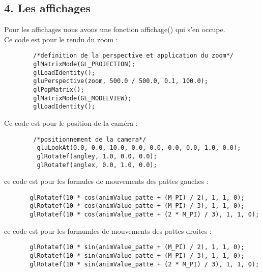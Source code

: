 \documentclass[11pt]{article}
\begin{document}
\subsection*{4. Les affichages}

    Pour les affichages nous avons une fonction affichage() qui s'en occupe.\\
     Ce code est pour le rendu du zoom :
     \begin{lstlisting}
        /*definition de la perspective et application du zoom*/
        glMatrixMode(GL_PROJECTION);
        glLoadIdentity();
        gluPerspective(zoom, 500.0 / 500.0, 0.1, 100.0);
        glPopMatrix();
        glMatrixMode(GL_MODELVIEW);
        glLoadIdentity();
     \end{lstlisting}
     
     Ce code est pour le position de la caméra :
     \begin{lstlisting}
        /*positionnement de la camera*/
         gluLookAt(0.0, 0.0, 10.0, 0.0, 0.0, 0.0, 0.0, 1.0, 0.0);
         glRotatef(angley, 1.0, 0.0, 0.0);
         glRotatef(anglex, 0.0, 1.0, 0.0);
    \end{lstlisting}
    
    ce code est pour les formules de mouvements des pattes gauches : 
    \begin{lstlisting}
       glRotatef(10 * cos(animValue_patte + (M_PI) / 2), 1, 1, 0);
       glRotatef(10 * cos(animValue_patte + (M_PI) / 3), 1, 1, 0);
       glRotatef(10 * cos(animValue_patte + (2 * M_PI) / 3), 1, 1, 0);
    \end{lstlisting}
    
    ce code est pour les formumles de mouvements des pattes droites :
    \begin{lstlisting}
       glRotatef(10 * sin(animValue_patte + (M_PI) / 2), 1, 1, 0);
       glRotatef(10 * sin(animValue_patte + (M_PI) / 3), 1, 1, 0);
       glRotatef(10 * sin(animValue_patte + (2 * M_PI) / 3), 1, 1, 0);
    \end{lstlisting}
\end{document}
